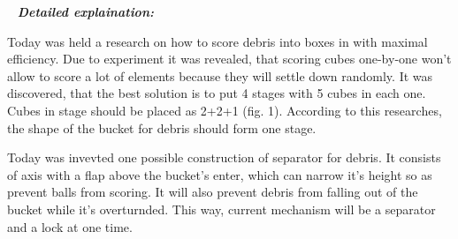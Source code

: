    \newline
  \textit{\textbf{Detailed explaination:}}
  \begin{enumerate*}
  	\item Today was held a research on how to score debris into boxes in with maximal efficiency. Due to experiment it was revealed, that scoring cubes one-by-one won't allow to score a lot of elements because they will settle down randomly. It was discovered, that the best solution is to put 4 stages with 5 cubes in each one. Cubes in stage should be placed as 2+2+1 (fig. 1). According to this researches, the shape of the bucket for debris should form one stage.
  	\begin{figure}[H]
  		\begin{minipage}[h]{1\linewidth}
  			\caption{}
  		\end{minipage}
  	\end{figure}
  	
  	\item Today was invevted one possible construction of separator for debris. It consists of axis with a flap above the bucket's enter, which can narrow it's height so as prevent balls from scoring. It will also prevent debris from falling out of the bucket while it's overturnded. This way, current mechanism will be a separator and a lock at one time.
  	\begin{figure}[H]
  		\begin{minipage}[h]{1\linewidth}
  			\caption{}
  		\end{minipage}
  	\end{figure}
  	

\end{enumerate*}
